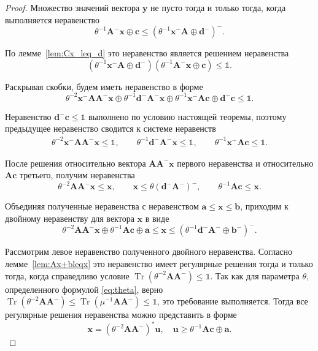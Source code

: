 \documentclass[specialist,
               substylefile = spbu.rtx,
               subf,href,colorlinks=true, 12pt]{disser}
\DeclareMathOperator{\Tr}{Tr}
\theoremstyle{definition}
\begin{document}
\begin{proof}
Множество значений вектора $\bm{y}$ не пусто тогда и только тогда, когда выполняется неравенство
\begin{equation*}
\theta^{-1}\bm{A}^{-}\bm{x}\oplus\bm{c}
\leq
(\theta^{-1}\bm{x}^{-}\bm{A}\oplus\bm{d}^{-})^{-}.
\end{equation*}

По лемме~\ref{lem:Cx_leq_d} это неравенство является решением неравенства 
\begin{equation*}
(\theta^{-1}\bm{x}^{-}\bm{A}\oplus\bm{d}^{-})
(\theta^{-1}\bm{A}^{-}\bm{x}\oplus\bm{c})
\leq
\mathbb{1}.
\end{equation*}

Раскрывая скобки, будем иметь неравенство в форме
\begin{equation*}
\theta^{-2}\bm{x}^{-}\bm{A}\bm{A}^{-}\bm{x}
\oplus
\theta^{-1}\bm{d}^{-}\bm{A}^{-}\bm{x}
\oplus
\theta^{-1}\bm{x}^{-}\bm{A}\bm{c}
\oplus
\bm{d}^{-}\bm{c}
\leq
\mathbb{1}.
\end{equation*}

Неравенство $\bm{d}^{-}\bm{c}
\leq
\mathbb{1}
$ 
выполнено по условию настоящей теоремы, поэтому предыдущее неравенство сводится к системе неравенств
\begin{gather*}
\theta^{-2}\bm{x}^{-}\bm{A}\bm{A}^{-}\bm{x}
\leq\mathbb{1},
\qquad
\theta^{-1}\bm{d}^{-}\bm{A}^{-}\bm{x}
\leq\mathbb{1},
\qquad
\theta^{-1}\bm{x}^{-}\bm{A}\bm{c}
\leq\mathbb{1}.
\end{gather*}

После решения относительно вектора $\bm{A}\bm{A}^{-}\bm{x}$ первого неравенства и относительно $\bm{A}\bm{c}$ третьего, получим 
неравенства  
\begin{equation*}
\theta^{-2}\bm{A}\bm{A}^{-}\bm{x}\leq\bm{x},
\qquad
\bm{x}\leq\theta(\bm{d}^{-}\bm{A}^{-})^{-},
\qquad
\theta^{-1}\bm{A}\bm{c}\leq\bm{x}.
\end{equation*}

Объединяя полученные неравенства с неравенством $\bm{a}\leq\bm{x}\leq\bm{b}$, приходим к двойному неравенству для вектора $\bm{x}$ в виде
\begin{equation}\label{eq:main}
\theta^{-2}\bm{A}\bm{A}^{-}\bm{x}
\oplus
\theta^{-1}\bm{A}\bm{c}\oplus
\bm{a}
\leq
\bm{x}
\leq
(\theta^{-1}\bm{d}^{-}\bm{A}^{-}\oplus\bm{b}^{-})^{-}.
\end{equation}

Рассмотрим левое неравенство полученного двойного неравенства.
Согласно лемме~\ref{lem:Ax+bleqx} это неравенство имеет регулярные решения тогда и только тогда, когда справедливо условие $\Tr(\theta^{-2}\bm{A}\bm{A}^{-})\leq\mathbb{1}$. Так как для параметра $\theta$, определенного формулой \eqref{eq:theta}, верно $\Tr(\theta^{-2}\bm{A}\bm{A}^{-})\leq\Tr(\mu^{-1}\bm{A}\bm{A}^{-})\leq\mathbb{1}$, это требование выполняется. Тогда все регулярные решения неравенства можно представить в форме 
\begin{equation*}
\bm{x}
=
(\theta^{-2}\bm{A}\bm{A}^{-})^{\ast}\bm{u},
\quad
\bm{u}
\geq
\theta^{-1}\bm{A}\bm{c}
\oplus
\bm{a}.
\end{equation*}


\end{proof}
\end{document}
